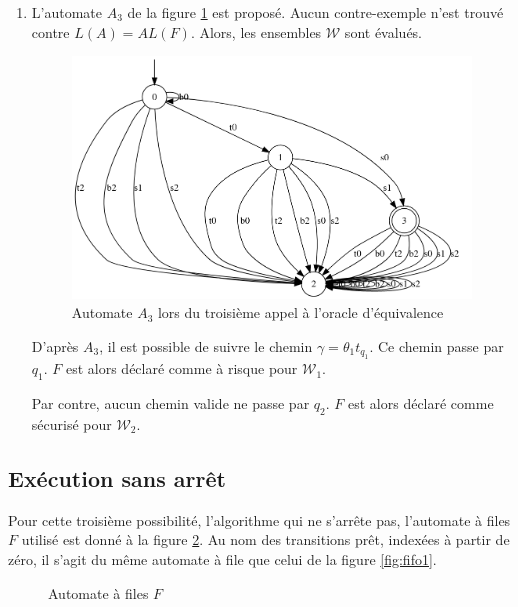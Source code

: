 \begin{enumerate}
\item L'automate $A_3$ de la figure \ref{fig:fina3} est proposé. Aucun contre-exemple n'est trouvé contre $L(A)=AL(F)$. Alors, les ensembles $\mathcal{W}$ sont évalués.
\begin{figure}[H]
  \centering
  \includegraphics[width=0.6\linewidth]{res/minimalist_2}
  \caption{Automate $A_3$ lors du troisième appel à l'oracle d'équivalence}\label{fig:fina3}
\end{figure}

D'après $A_3$, il est possible de suivre le chemin $\gamma=\theta_1t_{q_1}$. Ce chemin passe par $q_1$. $F$ est alors déclaré comme à risque pour $\mathcal{W}_1$.

Par contre, aucun chemin valide ne passe par $q_2$. $F$ est alors déclaré comme sécurisé pour $\mathcal{W}_2$.
\end{enumerate}



\subsection{Exécution sans arrêt}

Pour cette troisième possibilité, l'algorithme qui ne s'arrête pas, l'automate à files $F$ utilisé est donné à la figure \ref{fig:fifo2}. Au nom des transitions prêt, indexées à partir de zéro, il s'agit du même automate à file que celui de la figure \ref{fig:fifo1}.

\begin{figure}[H]
  \centering
  \caption{Automate à files $F$}\label{fig:fifo2}
\end{figure}



